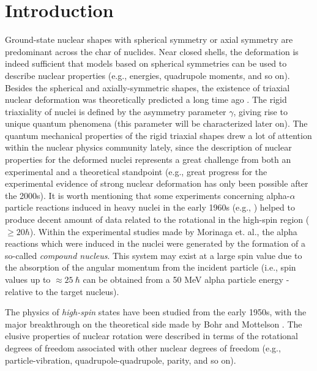 \chapter{Introduction}

Ground-state nuclear shapes with spherical symmetry or axial symmetry are predominant across the char of nuclides. Near closed shells, the deformation is indeed sufficient that models based on spherical symmetries can be used to describe nuclear properties (e.g., energies, quadrupole moments, and so on). Besides the spherical and axially-symmetric shapes, the existence of triaxial nuclear deformation was theoretically predicted a long time ago \cite{bohr1998nuclear}. The rigid triaxiality of nuclei is defined by the asymmetry parameter $\gamma$, giving rise to unique quantum phenomena (this parameter will be characterized later on). The quantum mechanical properties of the rigid triaxial shapes drew a lot of attention within the nuclear physics community lately, since the description of nuclear properties for the deformed nuclei represents a great challenge from both an experimental and a theoretical standpoint (e.g., great progress for the experimental evidence of strong nuclear deformation has only been possible after the 2000s). It is worth mentioning that some experiments concerning alpha-$\alpha$ particle reactions induced in heavy nuclei in the early 1960s (e.g., \cite{morinaga1963gamma}) helped to produce decent amount of data related to the rotational in the high-spin region ($\geq 20 \hbar$). Within the experimental studies made by Morinaga et. al., the alpha reactions which were induced in the nuclei were generated by the formation of a so-called \emph{compound nucleus}. This system may exist at a large spin value due to the absorption of the angular momentum from the incident particle (i.e., spin values up to $\approx25\ \hbar$ can be obtained from a 50 MeV alpha particle energy - relative to the target nucleus).

The physics of \emph{high-spin} states have been studied from the early 1950s, with the major breakthrough on the theoretical side made by Bohr and Mottelson \cite{bohr1998nuclear}. The elusive properties of nuclear rotation were described in terms of the rotational degrees of freedom associated with other nuclear degrees of freedom (e.g., particle-vibration, quadrupole-quadrupole, parity, and so on). 